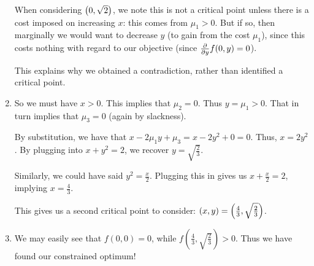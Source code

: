 \documentclass[11pt, oneside]{amsart}
\begin{document}
\begin{enumerate}
  When considering $\mathopen{}\left( {0, \sqrt{2}} \right)\mathclose{}$, we note this is not a
  critical point unless there is a cost imposed on increasing $x$: this
  comes from $\mu_1 > 0$. But if so, then marginally we would want to
  decrease $y$ (to gain from the cost $\mu_1$), since this costs nothing
  with regard to our objective (since $\frac{\partial }{\partial y} f(0, y) = 0$).

  This explains why we obtained a contradiction, rather than identified
  a critical point.

  \item So we must have $x > 0$. This implies that $\mu_2 = 0$. Thus $y
  = \mu_1 > 0$. That in turn implies that $\mu_3 = 0$ (again by
  slackness).

  By substitution, we have that $x - 2 \mu_1 y + \mu_3 = x - 2 y^2 + 0
  =0$. Thus, $x = 2 y^2$. By plugging into $x + y^2 = 2$, we recover $y
  = \sqrt{\frac{2}{3}}$.

  Similarly, we could have said $y^2 = \frac{x}{2}$. Plugging this in
  gives us $x + \frac{x}{2} = 2$, implying $x = \frac{4}{3}$.

  This gives us a second critical point to consider:
  $\mathopen{}\left( {x, y} \right)\mathclose{} = \mathopen{}\left( {\frac{4}{3}, \sqrt{\frac{2}{3}}} \right)\mathclose{}$.

  \item We may easily see that $f(0, 0) = 0$, while $f(\frac{4}{3},
  \sqrt{\frac{2}{3}}) > 0$. Thus we have found our constrained optimum!
\end{enumerate}
\end{document}
